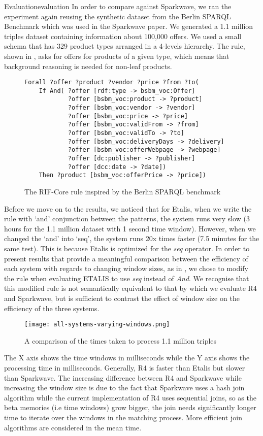 \begin{nestedsection}{Evaluation}{evaluation}
	In order to compare against Sparkwave, we ran the experiment again reusing the synthetic dataset from the Berlin SPARQL Benchmark \citep{BSBMresults} which was used in the Sparkwave paper.
	We generated a 1.1 million triples dataset containing information about 100,000 offers.
	We used a small schema that has 329 product types arranged in a 4-levels hierarchy.
	The rule, shown in , asks for offers for products of a given type, which means that background reasoning is needed for non-leaf products.
	\begin{figure*}
		\centering
		\begin{verbatim}
Forall ?offer ?product ?vendor ?price ?from ?to(
    If And( ?offer [rdf:type -> bsbm_voc:Offer]
            ?offer [bsbm_voc:product -> ?product]
            ?offer [bsbm_voc:vendor -> ?vendor]
            ?offer [bsbm_voc:price -> ?price]
            ?offer [bsbm_voc:validFrom -> ?from]
            ?offer [bsbm_voc:validTo -> ?to]
            ?offer [bsbm_voc:deliveryDays -> ?delivery]
            ?offer [bsbm_voc:offerWebpage -> ?webpage]
            ?offer [dc:publisher -> ?publisher]
            ?offer [dcc:date -> ?date])
    Then ?product [bsbm_voc:offerPrice -> ?price])
		\end{verbatim}
		\caption{The RIF-Core rule inspired by the Berlin SPARQL benchmark}
	\end{figure*}
	Before we move on to the results, we noticed that for Etalis, when we write the rule with ‘and’ conjunction between the patterns, the system runs very slow (3 hours for the 1.1 million dataset with 1 second time window).
	However, when we changed the `and' into `seq', the system runs 20x times faster (7.5 minutes for the same test).
	This is because Etalis is optimized for the \emph{seq} operator.
	In order to present results that provide a meaningful comparison between the efficiency of each system with regards to changing window sizes, as in , we chose to modify the rule when evaluating ETALIS to use \emph{seq} instead of \emph{And}.
	We recognise that this modified rule is not semantically equivalent to that by which we evaluate R4 and Sparkwave, but is sufficient to contrast the effect of window size on the efficiency of the three systems.
	\begin{figure}
		\centering
		\texttt{[image: all-systems-varying-windows.png]}
		\caption{A comparison of the times taken to process 1.1 million triples}
	\end{figure}
	The X axis shows the time windows in milliseconds while the Y axis shows the processing time in milliseconds.
	Generally, R4 is faster than Etalis but slower than Sparkwave.
	The increasing difference between R4 and Sparkwave while increasing the window size is due to the fact that Sparkwave uses a hash join algorithm while the current implementation of R4 uses sequential joins, so as the beta memories (i.e time windows) grow bigger, the join needs significantly longer time to iterate over the windows in the matching process.
	More efficient join algorithms are considered in the mean time.


\end{nestedsection}
